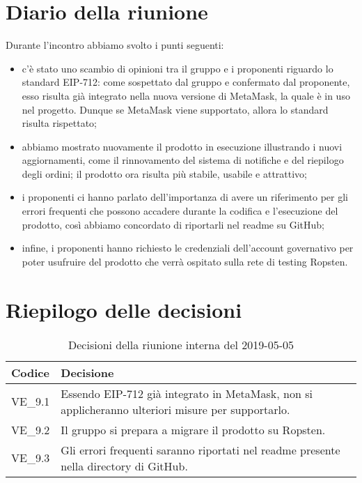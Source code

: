 \section{Diario della riunione}
Durante l'incontro abbiamo svolto i punti seguenti:
\begin{itemize}
	\item c'è stato uno scambio di opinioni tra il gruppo e i proponenti riguardo lo 
	standard EIP-712: come sospettato dal gruppo e confermato dal proponente, esso 
	risulta già integrato nella nuova versione di MetaMask, la quale è in uso nel 
	progetto. Dunque se MetaMask viene supportato, allora lo standard risulta 	
	rispettato;	
	\item abbiamo mostrato nuovamente il prodotto in esecuzione illustrando i nuovi 
	aggiornamenti, come il rinnovamento del sistema di notifiche e del riepilogo degli 
	ordini; il prodotto ora risulta più stabile, usabile e attrattivo;
	\item i proponenti ci hanno parlato dell'importanza di avere un riferimento per 
	gli errori frequenti che possono accadere durante la codifica e l'esecuzione del 
	prodotto, così abbiamo concordato di riportarli nel readme su GitHub;
	\item infine, i proponenti hanno richiesto le credenziali dell'account governativo
	per poter usufruire del prodotto che verrà ospitato sulla rete di testing Ropsten.
\end{itemize}


\hspace{3cm}

\section{Riepilogo delle decisioni}

	
	\begin{longtable}{ >{\centering}p{} >{}p{}}
		\caption{Decisioni della riunione interna del 2019-05-05}\\	
		\rowcolorhead
		\textbf{\color{white}Codice} 
		& \centering\textbf{\color{white}Decisione} 
		\tabularnewline 
		
		\endfirsthead
		VE\_9.1 & Essendo EIP-712 già integrato in MetaMask, non si applicheranno ulteriori misure per supportarlo.
		\tabularnewline
		
		VE\_9.2 & Il gruppo si prepara a migrare il prodotto su Ropsten.
		\tabularnewline
		
		VE\_9.3 & Gli errori frequenti saranno riportati nel readme presente nella directory di GitHub.
	\end{longtable}
	




